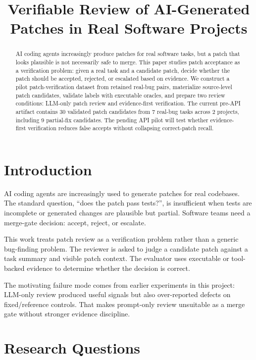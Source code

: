 \documentclass[conference]{IEEEtran}
\title{Verifiable Review of AI-Generated Patches in Real Software Projects}
\author{
\IEEEauthorblockN{Anonymous Authors}
\IEEEauthorblockA{Anonymous Institution\\
Email: anonymous@example.com}
}
\begin{document}
\maketitle

\begin{abstract}
AI coding agents increasingly produce patches for real software tasks, but a
patch that looks plausible is not necessarily safe to merge. This paper studies
patch acceptance as a verification problem: given a real task and a candidate
patch, decide whether the patch should be accepted, rejected, or escalated
based on evidence. We construct a pilot patch-verification dataset from
retained real-bug pairs, materialize source-level patch candidates, validate
labels with executable oracles, and prepare two review conditions: LLM-only
patch review and evidence-first verification. The current pre-API artifact
contains 30 validated patch candidates from 7 real-bug tasks across 2 projects,
including 9 partial-fix candidates. The pending API pilot will test whether
evidence-first verification reduces false accepts without collapsing
correct-patch recall.
\end{abstract}

\section{Introduction}

AI coding agents are increasingly used to generate patches for real codebases.
The standard question, ``does the patch pass tests?'', is insufficient when
tests are incomplete or generated changes are plausible but partial. Software
teams need a merge-gate decision: accept, reject, or escalate.

This work treats patch review as a verification problem rather than a generic
bug-finding problem. The reviewer is asked to judge a candidate patch against a
task summary and visible patch context. The evaluator uses executable or
tool-backed evidence to determine whether the decision is correct.

The motivating failure mode comes from earlier experiments in this project:
LLM-only review produced useful signals but also over-reported defects on
fixed/reference controls. That makes prompt-only review unsuitable as a merge
gate without stronger evidence discipline.

\section{Research Questions}
\end{document}
